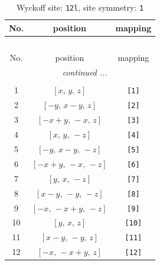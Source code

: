 \documentclass[fleqn,8pt]{jsarticle}
\begin{document}
\begin{longtable}{ccc}
\caption{Wyckoff site: {\tt 12l}, site symmetry: {\tt 1}}
 \\
 \hline \hline
No. & position & mapping \\ \hline \endfirsthead

\multicolumn{2}{l}{\tablename\ \thetable{}} \\
 \hline \hline
No. & position & mapping \\ \hline \endhead

 \hline \hline
\multicolumn{2}{r}{\footnotesize\it continued ...} \\ \endfoot

 \hline \hline
\multicolumn{2}{r}{} \\ \endlastfoot

1 & $\left[ x,\, y,\, z \right]$ & {\tt [1]} \\ \hline
2 & $\left[ - y,\, x - y,\, z \right]$ & {\tt [2]} \\ \hline
3 & $\left[ - x + y,\, - x,\, z \right]$ & {\tt [3]} \\ \hline
4 & $\left[ x,\, y,\, - z \right]$ & {\tt [4]} \\ \hline
5 & $\left[ - y,\, x - y,\, - z \right]$ & {\tt [5]} \\ \hline
6 & $\left[ - x + y,\, - x,\, - z \right]$ & {\tt [6]} \\ \hline
7 & $\left[ y,\, x,\, - z \right]$ & {\tt [7]} \\ \hline
8 & $\left[ x - y,\, - y,\, - z \right]$ & {\tt [8]} \\ \hline
9 & $\left[ - x,\, - x + y,\, - z \right]$ & {\tt [9]} \\ \hline
10 & $\left[ y,\, x,\, z \right]$ & {\tt [10]} \\ \hline
11 & $\left[ x - y,\, - y,\, z \right]$ & {\tt [11]} \\ \hline
12 & $\left[ - x,\, - x + y,\, z \right]$ & {\tt [12]} \\
\end{longtable}
\end{document}
